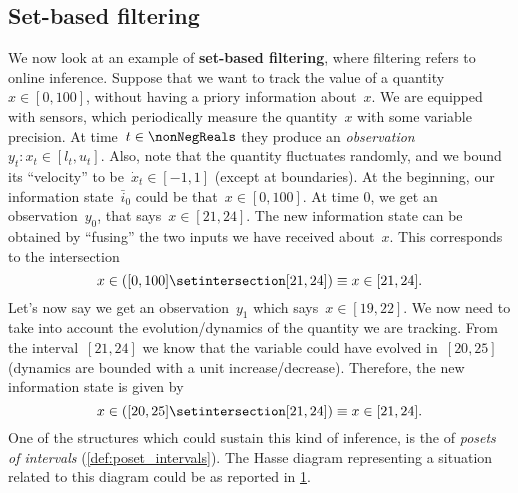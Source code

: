 \subsection{Set-based filtering}
\begin{example}
    We now look at an example of \textbf{set-based filtering}, where filtering refers to online inference.
    Suppose that we want to track the value of a quantity~$x\in [0,100]$, without having a priory information about~$x$.
    We are equipped with sensors, which periodically measure the quantity~$x$ with some variable precision.
    At time~$t\in \nonNegReals $ they produce an \emph{observation}~$y_t\colon x_t\in [l_t,u_t]$.
    Also, note that the quantity fluctuates randomly, and we bound its ``velocity'' to be~$\dot{x}_t\in [-1,1]$ (except at boundaries).
    At the beginning, our information state~$\bar{i}_0$ could be that~$x\in [0,100]$.
    At time 0, we get an observation~$y_0$, that says~$x\in [21,24]$.
    The new information state can be obtained by ``fusing'' the two inputs we have received about~$x$.
    This corresponds to the intersection
    \begin{equation*}
        x\in \left( [0,100] \setintersection [21,24]\right)\equiv x\in [21,24].
    \end{equation*}
    Let's now say we get an observation~$y_1$ which says~$x\in [19,22]$.
    We now need to take into account the evolution/dynamics of the quantity we are tracking.
    From the interval~$[21,24]$ we know that the variable could have evolved in~$[20,25]$ (dynamics are bounded with a unit increase/decrease).
    Therefore, the new information state is given by
    \begin{equation*}
        x\in \left( [20,25] \setintersection [21,24]\right)\equiv x\in [21,24].
    \end{equation*}
    One of the structures which could sustain this kind of inference, is the of \emph{posets of intervals} (\cref{def:poset_intervals}).
    The Hasse diagram representing a situation related to this diagram could be as reported in \cref{fig:hasse_filtering}.
    \begin{figure}[h!]
        \centering
        \caption{}
        \label{fig:hasse_filtering}
    \end{figure}
\end{example}
